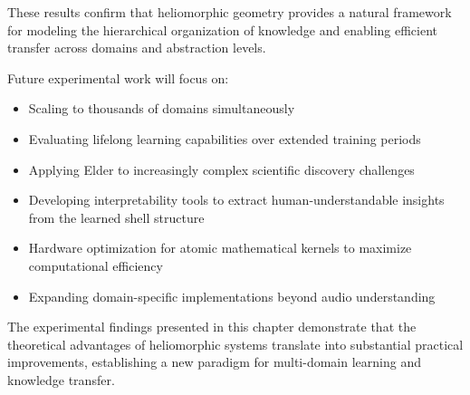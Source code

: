 These results confirm that heliomorphic geometry provides a natural framework for modeling the hierarchical organization of knowledge and enabling efficient transfer across domains and abstraction levels.

Future experimental work will focus on:

\begin{itemize}
    \item Scaling to thousands of domains simultaneously
    \item Evaluating lifelong learning capabilities over extended training periods
    \item Applying Elder to increasingly complex scientific discovery challenges
    \item Developing interpretability tools to extract human-understandable insights from the learned shell structure
    \item Hardware optimization for atomic mathematical kernels to maximize computational efficiency
    \item Expanding domain-specific implementations beyond audio understanding
\end{itemize}

The experimental findings presented in this chapter demonstrate that the theoretical advantages of heliomorphic systems translate into substantial practical improvements, establishing a new paradigm for multi-domain learning and knowledge transfer.